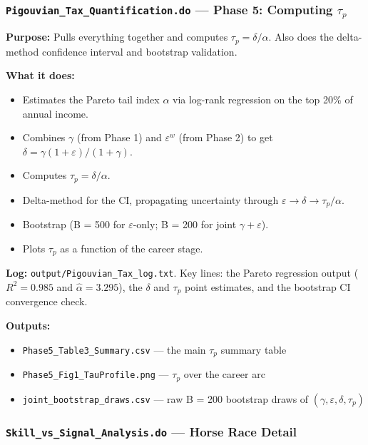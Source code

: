 \documentclass[11pt, letterpaper]{article}
\newcommand{\dofile}[1]{\texttt{#1}}
\newcommand{\logfile}[1]{\texttt{#1}}
\newcommand{\outputfile}[1]{\texttt{#1}}
\begin{document}
\vspace{6pt}
\subsubsection{\dofile{Pigouvian\_Tax\_Quantification.do} \textnormal{--- Phase 5: Computing $\tau_p$}}

\textbf{Purpose:} Pulls everything together and computes $\tau_p = \delta/\alpha$. Also does the delta-method confidence interval and bootstrap validation.

\textbf{What it does:}
\begin{itemize}
    \item Estimates the Pareto tail index $\alpha$ via log-rank regression on the top 20\% of annual income.
    \item Combines $\gamma$ (from Phase 1) and $\varepsilon^w$ (from Phase 2) to get $\delta = \gamma(1+\varepsilon)/(1+\gamma)$.
    \item Computes $\tau_p = \delta/\alpha$.
    \item Delta-method for the CI, propagating uncertainty through $\varepsilon \to \delta \to \tau_p/\alpha$.
    \item Bootstrap (B = 500 for $\varepsilon$-only; B = 200 for joint $\gamma + \varepsilon$).
    \item Plots $\tau_p$ as a function of the career stage.
\end{itemize}

\textbf{Log:} \logfile{output/Pigouvian\_Tax\_log.txt}. Key lines: the Pareto regression output ($R^2 = 0.985$ and $\hat{\alpha} = 3.295$), the $\delta$ and $\tau_p$ point estimates, and the bootstrap CI convergence check.

\textbf{Outputs:}
\begin{itemize}
    \item \outputfile{Phase5\_Table3\_Summary.csv} --- the main $\tau_p$ summary table
    \item \outputfile{Phase5\_Fig1\_TauProfile.png} --- $\tau_p$ over the career arc
    \item \outputfile{joint\_bootstrap\_draws.csv} --- raw B = 200 bootstrap draws of $(\gamma, \varepsilon, \delta, \tau_p)$
\end{itemize}

\vspace{6pt}
\subsubsection{\dofile{Skill\_vs\_Signal\_Analysis.do} \textnormal{--- Horse Race Detail}}
\end{document}
